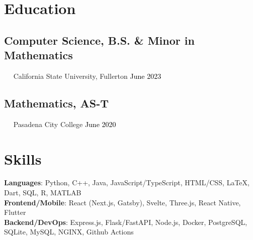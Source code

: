 \documentclass{article}
\newcommand{\resumesection}[3]{
    \subsection*{#1}
    \ 
    \ 
    \small
    \textcolor{csufgrey}{#2}
    \normalsize
    \hfill
    \textcolor{black}{#3}
    \normalsize
}
\begin{document}
\pagestyle{useheader}

\section*{Education}
\resumesection{Computer Science, B.S. \& Minor in Mathematics}{California State University, Fullerton}{June 2023}%
\resumesection{Mathematics, AS-T}{Pasadena City College}{June 2020}
\section*{Skills}
\textbf{Languages}: Python, C++, Java, JavaScript/TypeScript, HTML/CSS, {\selectfont\LaTeX}, Dart, SQL, R, MATLAB\\
\textbf{Frontend/Mobile}: React (Next.js, Gatsby), Svelte, Three.js, React Native, Flutter\\
\textbf{Backend/DevOps}: Express.js, Flask/FastAPI, Node.js, Docker, PostgreSQL, SQLite, MySQL, NGINX, Github Actions
\end{document}
